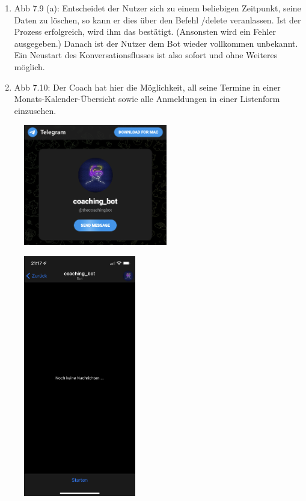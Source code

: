 \begin{enumerate}
		\item Abb 7.9 (a): Entscheidet der Nutzer sich zu einem beliebigen Zeitpunkt, seine Daten zu löschen, so kann er dies über den Befehl /delete veranlassen. Ist der Prozess erfolgreich, wird ihm das bestätigt. (Ansonsten wird ein Fehler ausgegeben.) Danach ist der Nutzer dem Bot wieder vollkommen unbekannt. Ein Neustart des Konversationsflusses ist also sofort und ohne Weiteres möglich.
		\item Abb 7.10: Der Coach hat hier die Möglichkeit, all seine Termine in einer Monats-Kalender-Übersicht sowie alle Anmeldungen in einer Listenform einzusehen. 
		
	\end{enumerate}
	

	\begin{figure}
		\centering
		\begin{minipage}{.48\linewidth}
		  \centering
			{\includegraphics[width=\linewidth,height=150pt,keepaspectratio]{images/Screenshots/link.png}}
	  
			{\includegraphics[width=\linewidth,height=300pt,keepaspectratio]{images/Screenshots/start.PNG}}
	  

\end{minipage}
\end{figure}
